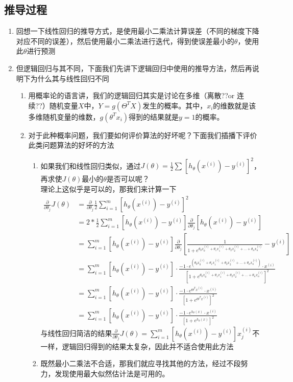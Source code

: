 \subsection{推导过程}
\begin{enumerate}
	\item 回想一下线性回归的推导方式，是使用最小二乘法计算误差（不同的梯度下降对应不同的误差），然后使用最小二乘法进行迭代，得到使误差最小的$\theta$，使用此$\theta$进行预测

	\item 但逻辑回归与其不同，下面我们先讲下逻辑回归中使用的推导方法，然后再说明下为什么其与线性回归不同
	\begin{enumerate}
		\item 用概率论的语言讲，我们的逻辑回归其实是讨论在多维（离散??or 连续??）随机变量$X$中，$Y=g(\Theta^TX)$发生的概率。其中，$x_i$的维数就是该多维随机变量的维数，$g(\theta^Tx_i)$得到的结果就是$y=1$的概率。

		\item 对于此种概率问题，我们要如何评价算法的好坏呢？下面我们插播下评价此类问题算法的好坏的方法
		\begin{enumerate}
			\item 如果我们和线性回归类似，通过$J(\theta) = \frac{1}{2} \sum_{}^{} \left[h_\theta(x^{(i)}) - y^{(i)}\right]^2$，再求使$J(\theta)$最小的$\theta$是否可以呢？\\
			理论上这似乎是可以的，那我们来计算一下
			\begin{align}
				\frac{\partial} {\partial \theta_j} J(\theta) &= \frac{\partial}{\partial \theta_j} \frac{1}{2} \sum_{i=1}^m\left[ h_\theta(x^{(i)}) - y^{(i)} \right]^2 \\
			      &= 2 * \frac{1}{2} \sum_{i=1}^m\left[ h_\theta(x^{(i)}) - y^{(i)} \right] \frac{\partial}{\partial\theta_j}\left[ h_\theta(x^{(i)}) - y^{(i)} \right] \\
			      &= \sum_{i=1}^m\left[ h_\theta(x^{(i)}) - y^{(i)} \right]\frac{\partial}{\partial\theta_j}\left[ \frac{1}{1+e^{\theta_0x_0^{(i)} +  \theta_1x_1^{(i)} + \theta_2x_2^{(i)} + ... + \theta_nx_n^{(i)}} } - y^{(i)} \right] \\
			      &= \sum_{i=1}^m\left[ h_\theta(x^{(i)}) - y^{(i)} \right] \cdot \frac{-1\cdot e^{(\theta_0x_0^{(i)}+ \theta_1x_1^{(i)} + \theta_2x_2^{(i)} + ... + \theta_nx_n^{(i)})}\cdot x^{(i)}}{\left[1+e^{\theta_0x_0^{(i)} +  \theta_1x_1^{(i)} + \theta_2x_2^{(i)} + ... + \theta_nx_n^{(i)}}\right]^2} \\
			      &= \sum_{i=1}^m\left[ h_\theta(x^{(i)}) - y^{(i)} \right] \cdot \frac{-1\cdot e^{\Theta^Tx^{(i)}}\cdot x^{(i)}}{\left[1 + e^{\Theta^Tx^{(i)}}\right]^2} \\
			      &= \sum_{i=1}^m\left[ h_\theta(x^{(i)}) - y^{(i)} \right] \cdot \frac{-1\cdot e^{h_\theta(x)}\cdot x^{(i)}}{\left[1 + e^{h_\theta(x)}\right]^2}
			\end{align}
			与线性回归简洁的结果$\frac{\partial} {\partial \theta_j} J(\theta) = \sum_{i=1}^m\left[ h_\theta(x^{(i)}) - y^{(i)} \right]x_j^{(i)}$不一样，逻辑回归得到的结果太复杂，因此并不适合使用此方法
			\item 既然最小二乘法不合适，那我们就应寻找其他的方法，经过不段努力，发现使用最大似然估计法是可用的。


\end{enumerate}
\end{enumerate}
\end{enumerate}

